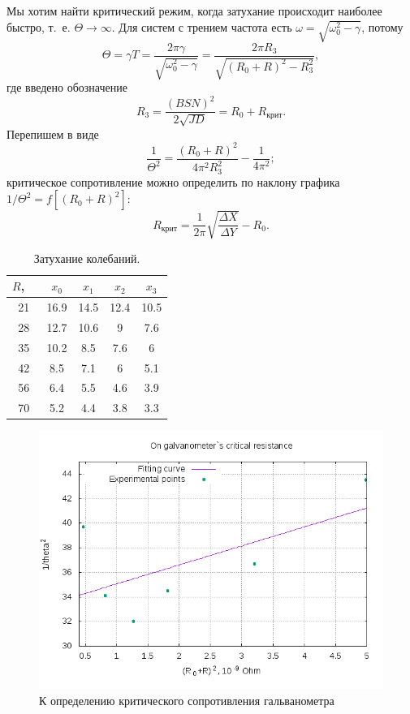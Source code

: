 \documentclass{../lab_class}
\begin{document}
Мы хотим найти критический режим, когда затухание происходит наиболее быстро, т.~е. $\Theta \to \infty$. Для систем с трением частота есть $\omega = \sqrt{\omega_0^2 - \gamma}$, потому
\begin{equation*}
	\Theta = \gamma T = \frac{2\pi\gamma}{\sqrt{\omega_0^2 - \gamma}} = \frac{2\pi R_3}{\sqrt{(R_0+R)^2 - R_3^2}},
\end{equation*} 
где введено обозначение
\begin{equation*}
	R_3 = \frac{(BSN)^2}{2\sqrt{JD}} = R_0 + R_{\text{крит}}.
\end{equation*}
Перепишем в виде
\begin{equation*}
	\frac{1}{\Theta^2} = \frac{(R_0+R)^2}{4\pi^2 R_3^2} - \frac{1}{4\pi^2};
\end{equation*}
критическое сопротивление можно определить по наклону графика $1/\Theta^2 = f[(R_0+R)^2]$:
\begin{equation*}
	R_{\text{крит}} = \frac{1}{2\pi} \sqrt{\frac{\Delta X}{\Delta Y}} - R_0.
\end{equation*}

\begin{table}[H]
	\centering
	\begin{tabular}{|c|c|c|c|c|}
		\hline
		$R$, \ \sk \Ohm & $x_0$ & $x_1$ & $x_2$ & $x_3$ \\ \hline
		21 & 16.9 & 14.5 & 12.4 & 10.5 \\ \hline
		28 & 12.7 & 10.6 & 9 & 7.6 \\ \hline
		35 & 10.2 & 8.5 & 7.6 & 6 \\ \hline
		42 & 8.5 & 7.1 & 6 & 5.1 \\ \hline
		56 & 6.4 & 5.5 & 4.6 & 3.9 \\ \hline
		70 & 5.2 & 4.4 & 3.8 & 3.3 \\ \hline
	\end{tabular}
	\caption{Затухание колебаний.}
\end{table}

\begin{figure}[H]
	\centering
	\includegraphics[width = 0.87 \textwidth]{critical_resistance.png}
	\caption{К определению критического сопротивления гальванометра}
\end{figure}
\end{document}
